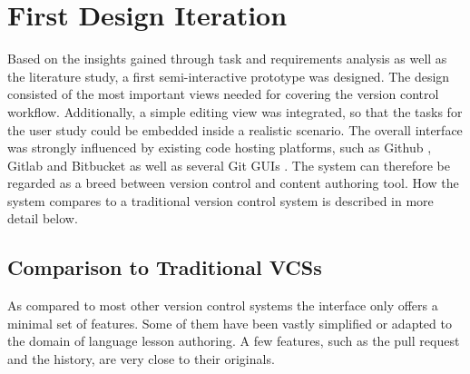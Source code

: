 \chapter{First Design Iteration} \label{chapter:design-first-iteration}
Based on the insights gained through task and requirements analysis as well as the literature study, a first semi-interactive prototype was designed. The design consisted of the most important views needed for covering the version control workflow. Additionally, a simple editing view was integrated, so that the tasks for the user study could be embedded inside a realistic scenario. The overall interface was strongly influenced by existing code hosting platforms, such as Github \cite{_about_????}, Gitlab \cite{_code_????} and Bitbucket \cite{_bitbucket_????} as well as several Git GUIs \cite{_git_????}. The system can therefore be regarded as a breed between version control and content authoring tool. How the system compares to a traditional version control system is described in more detail below. 

\section{Comparison to Traditional VCSs} \label{sec:git-feature-comparison}
As compared to most other version control systems the interface only offers a minimal set of features. Some of them have been vastly simplified or adapted to the domain of language lesson authoring. A few features, such as the pull request and the history, are very close to their originals.

